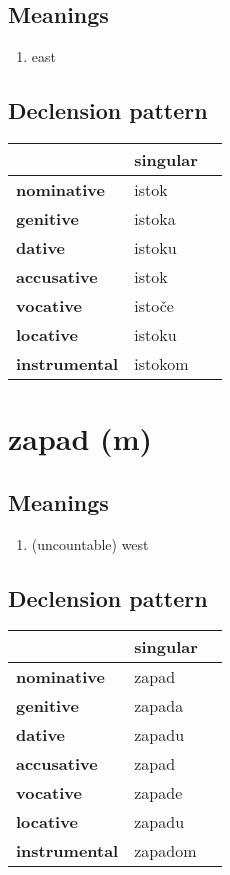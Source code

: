 \subsection*{Meanings}
\begin{enumerate}
\item east
\end{enumerate}
\subsection*{Declension pattern}
\begin{tabularx}{\linewidth}{Xll}
\toprule
{} & singular \\
\midrule
\textbf{nominative  } &    istok \\
\textbf{genitive    } &   istoka \\
\textbf{dative      } &   istoku \\
\textbf{accusative  } &    istok \\
\textbf{vocative    } &   istoče \\
\textbf{locative    } &   istoku \\
\textbf{instrumental} &  istokom \\
\bottomrule
\end{tabularx}

\filbreak
\section{zapad (m)}
\subsection*{Meanings}
\begin{enumerate}
\item (uncountable) west
\end{enumerate}
\subsection*{Declension pattern}
\begin{tabularx}{\linewidth}{Xll}
\toprule
{} & singular \\
\midrule
\textbf{nominative  } &    zapad \\
\textbf{genitive    } &   zapada \\
\textbf{dative      } &   zapadu \\
\textbf{accusative  } &    zapad \\
\textbf{vocative    } &   zapade \\
\textbf{locative    } &   zapadu \\
\textbf{instrumental} &  zapadom \\
\bottomrule
\end{tabularx}


